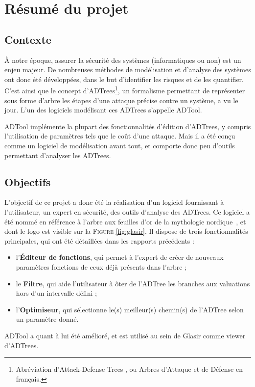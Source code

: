\section{Résumé du projet}
\label{sec:sumup}

\subsection{Contexte}
\label{ssec:contexte}

    À notre époque, assurer la sécurité des systèmes (informatiques ou non) est un enjeu majeur. De nombreuses méthodes de modélisation et d'analyse des systèmes ont donc été développées, dans le but d'identifier les risques et de les quantifier. C'est ainsi que le concept d'ADTrees\footnote{Abréviation d'\og Attack-Defense Trees \fg{}, ou \og Arbres d'Attaque et de Défense\fg{} en français.}, un formalisme permettant de représenter sous forme d'arbre les étapes d'une attaque précise contre un système, a vu le jour. L'un des logiciels modélisant ces ADTrees s'appelle ADTool.

    ADTool implémente la plupart des fonctionnalités d'édition d'ADTrees, y compris l'utilisation de paramètres tels que le coût d'une attaque. Mais il a été conçu comme un logiciel de modélisation avant tout, et comporte donc peu d'outils permettant d'analyser les ADTrees.

\subsection{Objectifs}
\label{ssec:objectifs}

    L'objectif de ce projet a donc été la réalisation d'un logiciel fournissant à l'utilisateur, un expert en sécurité, des outils d'analyse des ADTrees. Ce logiciel a été nommé \glasir{} en référence à l'arbre aux feuilles d'or de la mythologie nordique~\cite{vikingCulture}, et dont le logo est visible sur la \textsc{Figure} \ref{fig:glasir}. Il dispose de trois fonctionnalités principales, qui ont été détaillées dans les rapports précédents :
\begin{itemize}
    	\item l'{\bf Éditeur de fonctions}, qui permet à l'expert de créer de nouveaux paramètres fonctions de ceux déjà présents dans l'arbre ;
    	\item le {\bf Filtre}, qui aide l'utilisateur à ôter de l'ADTree les branches aux valuations hors d'un intervalle défini ;
    	\item l'{\bf Optimiseur}, qui sélectionne le(s) meilleur(s) chemin(s) de l'ADTree selon un paramètre donné.
\end{itemize} 
    ADTool a quant à lui été amélioré, et est utilisé au sein de Glasir comme viewer d'ADTrees. 

